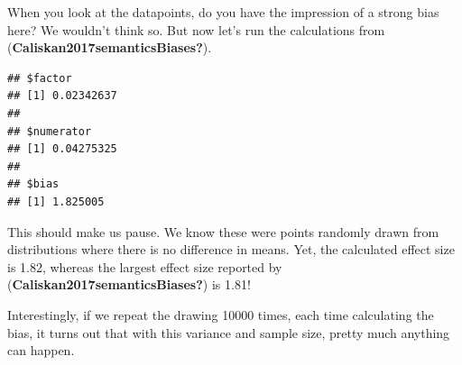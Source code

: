 \documentclass[
  10pt,
  dvipsnames,enabledeprecatedfontcommands]{scrartcl}
\newenvironment{Shaded}{\begin{snugshade}}{\end{snugshade}}
\newcommand{\AttributeTok}[1]{\textcolor[rgb]{0.77,0.63,0.00}{#1}}
\newcommand{\ControlFlowTok}[1]{\textcolor[rgb]{0.13,0.29,0.53}{\textbf{#1}}}
\newcommand{\FunctionTok}[1]{\textcolor[rgb]{0.00,0.00,0.00}{#1}}
\newcommand{\NormalTok}[1]{#1}
\newcommand{\OtherTok}[1]{\textcolor[rgb]{0.56,0.35,0.01}{#1}}
\newcommand{\SpecialCharTok}[1]{\textcolor[rgb]{0.00,0.00,0.00}{#1}}
\begin{document}
\noindent When you look at the datapoints, do you have the impression of
a strong bias here? We wouldn't think so. But now let's run the
calculations from (\textbf{Caliskan2017semanticsBiases?}).

\vspace{1mm}
\footnotesize

\begin{Shaded}
\end{Shaded}

\begin{verbatim}
## $factor
## [1] 0.02342637
## 
## $numerator
## [1] 0.04275325
## 
## $bias
## [1] 1.825005
\end{verbatim}

\normalsize

\noindent This should make us pause. We know these were points randomly
drawn from distributions where there is no difference in means. Yet, the
calculated effect size is 1.82, whereas the largest effect size reported
by (\textbf{Caliskan2017semanticsBiases?}) is 1.81!

Interestingly, if we repeat the drawing 10000 times, each time
calculating the bias, it turns out that with this variance and sample
size, pretty much anything can happen.

\vspace{1mm}
\footnotesize
\end{document}
